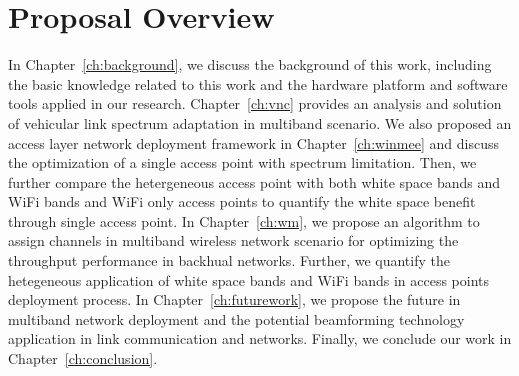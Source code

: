 

\section{Proposal Overview}

In Chapter~\ref{ch:background}, we discuss the background of this work, 
including the basic knowledge related to this work and the hardware 
platform and software tools applied in our research. Chapter~\ref{ch:vnc} 
provides an analysis and solution of vehicular link spectrum adaptation in 
multiband scenario. We also proposed an access layer network deployment 
framework in Chapter~\ref{ch:winmee} and discuss the optimization of a 
single access point with spectrum limitation. Then, we further
compare the hetergeneous access point with both white space bands and WiFi 
bands and WiFi only access points to quantify the white space benefit 
through single access point. In Chapter~\ref{ch:wm}, we propose an 
algorithm to assign channels in multiband wireless network scenario for 
optimizing the throughput performance in backhual networks. Further, we 
quantify the hetegeneous application of white space bands and WiFi bands 
in access points deployment process. In Chapter~\ref{ch:futurework}, we 
propose the future in multiband network deployment and the potential 
beamforming technology application in link communication and networks. 
Finally, we conclude our work in Chapter~\ref{ch:conclusion}.

